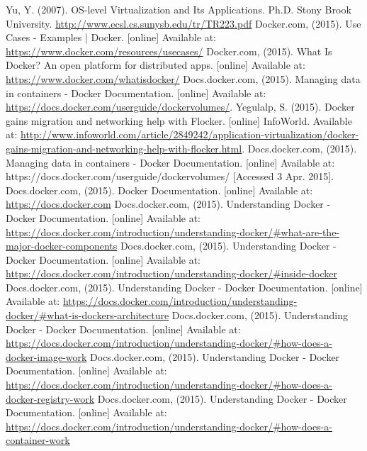 \documentclass{article}
\begin{document}
\clearpage
\begin{thebibliography}{99}
Yu, Y. (2007). OS-level Virtualization and Its Applications. Ph.D. Stony Brook University.
\url{http://www.ecsl.cs.sunysb.edu/tr/TR223.pdf}
Docker.com, (2015). Use Cases - Examples | Docker. [online] Available at: \url{https://www.docker.com/resources/usecases/}
Docker.com, (2015). What Is Docker? An open platform for distributed apps. [online] Available at: \url{https://www.docker.com/whatisdocker/}
Docs.docker.com, (2015). Managing data in containers - Docker Documentation. [online] Available at: \url{https://docs.docker.com/userguide/dockervolumes/}.
Yegulalp, S. (2015). Docker gains migration and networking help with Flocker. [online] InfoWorld. Available at: \url{http://www.infoworld.com/article/2849242/application-virtualization/docker-gains-migration-and-networking-help-with-flocker.html}.
Docs.docker.com, (2015). Managing data in containers - Docker Documentation. [online] Available at: https://docs.docker.com/userguide/dockervolumes/ [Accessed 3 Apr. 2015].
Docs.docker.com, (2015). Docker Documentation. [online] Available at: \url{https://docs.docker.com}
Docs.docker.com, (2015). Understanding Docker - Docker Documentation. [online] Available at:
\url{https://docs.docker.com/introduction/understanding-docker/#what-are-the-major-docker-components}
Docs.docker.com, (2015). Understanding Docker - Docker Documentation. [online] Available at: \url{https://docs.docker.com/introduction/understanding-docker/#inside-docker}
Docs.docker.com, (2015). Understanding Docker - Docker Documentation. [online] Available at:
\url{https://docs.docker.com/introduction/understanding-docker/#what-is-dockers-architecture}
Docs.docker.com, (2015). Understanding Docker - Docker Documentation. [online] Available at: \url{https://docs.docker.com/introduction/understanding-docker/#how-does-a-docker-image-work}
Docs.docker.com, (2015). Understanding Docker - Docker Documentation. [online] Available at: \url{https://docs.docker.com/introduction/understanding-docker/#how-does-a-docker-registry-work}
Docs.docker.com, (2015). Understanding Docker - Docker Documentation. [online] Available at: \url{https://docs.docker.com/introduction/understanding-docker/#how-does-a-container-work}

\end{thebibliography}
\end{document}
